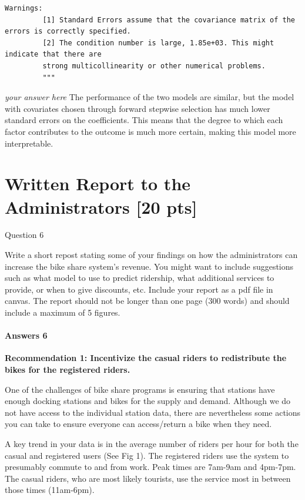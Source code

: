 \documentclass[11pt]{article}
\begin{document}
\begin{Verbatim}[commandchars=\\\{\}]
         Warnings:
         [1] Standard Errors assume that the covariance matrix of the errors is correctly specified.
         [2] The condition number is large, 1.85e+03. This might indicate that there are
         strong multicollinearity or other numerical problems.
         """
\end{Verbatim}
            
    \emph{your answer here} The performance of the two models are similar,
but the model with covariates chosen through forward stepwise selection
has much lower standard errors on the coefficients. This means that the
degree to which each factor contributes to the outcome is much more
certain, making this model more interpretable.

    \section{Written Report to the Administrators {[}20
pts{]}}\label{written-report-to-the-administrators-20-pts}

 Question 6

Write a short repost stating some of your findings on how the
administrators can increase the bike share system's revenue. You might
want to include suggestions such as what model to use to predict
ridership, what additional services to provide, or when to give
discounts, etc. Include your report as a pdf file in canvas. The report
should not be longer than one page (300 words) and should include a
maximum of 5 figures.

    \paragraph{Answers 6}\label{answers-6}

    \textbf{Recommendation 1: Incentivize the casual riders to redistribute
the bikes for the registered riders.}

One of the challenges of bike share programs is ensuring that stations
have enough docking stations and bikes for the supply and demand.
Although we do not have access to the individual station data, there are
nevertheless some actions you can take to ensure everyone can
access/return a bike when they need.

A key trend in your data is in the average number of riders per hour for
both the casual and registered users (See Fig 1). The registered riders
use the system to presumably commute to and from work. Peak times are
7am-9am and 4pm-7pm. The casual riders, who are most likely tourists,
use the service most in between those times (11am-6pm).
\end{document}
